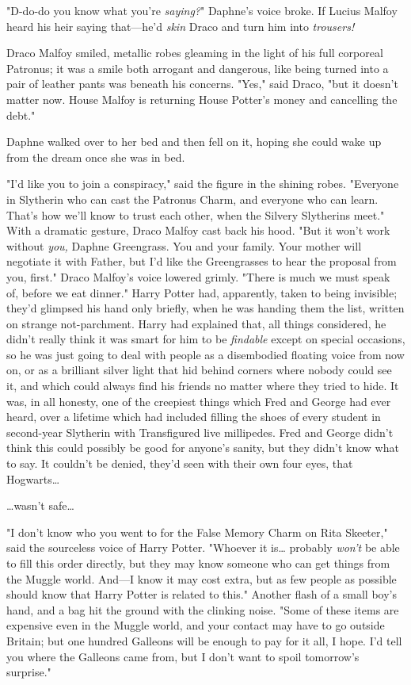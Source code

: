 "D-do-do you know what you're \emph{saying?}" Daphne's voice broke. If Lucius Malfoy heard his heir saying that---he'd \emph{skin} Draco and turn him into \emph{trousers!}

Draco Malfoy smiled, metallic robes gleaming in the light of his full corporeal Patronus; it was a smile both arrogant and dangerous, like being turned into a pair of leather pants was beneath his concerns. "Yes," said Draco, "but it doesn't matter now. House Malfoy is returning House Potter's money and cancelling the debt."

Daphne walked over to her bed and then fell on it, hoping she could wake up from the dream once she was in bed.

"I'd like you to join a conspiracy," said the figure in the shining robes. "Everyone in Slytherin who can cast the Patronus Charm, and everyone who can learn. That's how we'll know to trust each other, when the Silvery Slytherins meet." With a dramatic gesture, Draco Malfoy cast back his hood. "But it won't work without \emph{you,} Daphne Greengrass. You and your family. Your mother will negotiate it with Father, but I'd like the Greengrasses to hear the proposal from you, first." Draco Malfoy's voice lowered grimly. "There is much we must speak of, before we eat dinner."
\sbreak
Harry Potter had, apparently, taken to being invisible; they'd glimpsed his hand only briefly, when he was handing them the list, written on strange not-parchment. Harry had explained that, all things considered, he didn't really think it was smart for him to be \emph{findable} except on special occasions, so he was just going to deal with people as a disembodied floating voice from now on, or as a brilliant silver light that hid behind corners where nobody could see it, and which could always find his friends no matter where they tried to hide. It was, in all honesty, one of the creepiest things which Fred and George had ever heard, over a lifetime which had included filling the shoes of every student in second-year Slytherin with Transfigured live millipedes. Fred and George didn't think this could possibly be good for anyone's sanity, but they didn't know what to say. It couldn't be denied, they'd seen with their own four eyes, that Hogwarts{\ldots}

{\ldots}wasn't safe{\ldots}

"I don't know who you went to for the False Memory Charm on Rita Skeeter," said the sourceless voice of Harry Potter. "Whoever it is{\ldots} probably \emph{won't} be able to fill this order directly, but they may know someone who can get things from the Muggle world. And---I know it may cost extra, but as few people as possible should know that Harry Potter is related to this." Another flash of a small boy's hand, and a bag hit the ground with the clinking noise. "Some of these items are expensive even in the Muggle world, and your contact may have to go outside Britain; but one hundred Galleons will be enough to pay for it all, I hope. I'd tell you where the Galleons came from, but I don't want to spoil tomorrow's surprise."


